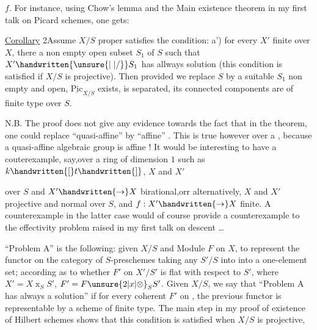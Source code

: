 $f$. For instance, using Chow's lemma and the Main existence theorem in my first talk on Picard schemes, one gets:

\uline{Corollary} 2\quad Assume $X/S$ proper satisfies the condition:   a') for every $X'$ finite over $X$, there  a non empty open subset $S_1$ of $S$ such that  $X'\handwritten{\unsure{\mid|/}}S_1$ has allways solution  (this condition is satisfied if $X/S$ is projective). Then  provided we replace $S$ by a suitable $S_1$ non empty and open, $\underline{\mathrm{Pic}}_{X/S}$ exists, is separated, its connected components are of finite type over $S$.

N.B. The proof does not give any evidence towards the fact that in the theorem, one could replace ``quasi-affine'' by ``affine'' . This is true however over a , because a quasi-affine algebraic group is affine ! It would be interesting to have a couterexample, say,over a  ring of dimension $1$ such as $k\handwritten{[}t\handwritten{]}$, $X$ and $X'$   over $S$ and $X'\handwritten{\to}X$ birational,orr alternatively,  $X$ and $X'$ projective and normal over $S$, and $f:X'\handwritten{\to}X$ finite. A counterexample in the latter case would of course provide a counterexample to the effectivity problem  raised in my first talk on descent \dots

``Problem A'' is the following: given $X/S$ and  Module $F$ on $X$, to represent the functor on the category of $S$-preschemes taking any $S'/S$ into  into a one-element  set; according as to whether $F'$ on $X'/S'$ is flat with respect to $S'$, where $X'=X\mathbin{x}_S S'$, $F'=F\unsure{2|x|\otimes}_S S'$. Given $X/S$, we say that ``Problem A  has always a solution'' if for every coherent $F'$ on , the previous functor  is representable by a scheme of finite type. The main step in my proof of existence of Hilbert schemes shows that this condition is satisfied when $X/S$ is projective,
